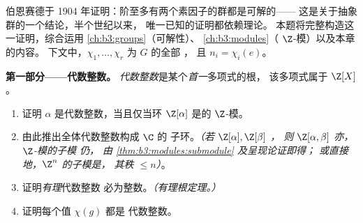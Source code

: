 \begin{problem}\label{pb:b3:representations:1}
伯恩赛德于 1904 年证明：阶至多有两个素因子的群都是可解的——
这是关于抽象群的一个结论，半个世纪以来，
唯一已知的证明都依赖理论。
本题将完整构造这一证明，综合运用 \cref{ch:b3:groups}（可解性）、
\cref{ch:b3:modules}（ $\Z$-模）以及本章的内容。
下文中，$\chi_1, \dots, \chi_r$ 为 $G$ 的全部
，
且 $n_i = \chi_i(e)$。

\medskip
\noindent\textbf{第一部分——代数整数。}
\emph{代数整数}是某个\emph{首一}多项式的根，
该多项式属于 $\Z[X]$。
\begin{enumerate}
  \item 证明 $\alpha$ 是代数整数，当且仅当环
        $\Z[\alpha]$ 是的 $\Z$-模。
  \item 由此推出全体代数整数构成 $\C$ 的
        子环。\emph{（若 $\Z[\alpha], \Z[\beta]$ ，
        则 $\Z[\alpha, \beta]$ 亦， $\Z$-模的子模
        仍，
        由 \cref{thm:b3:modules:submodule} 及呈现论证即得；
        或直接地，$\Z^n$ 的子模是，
        其秩 $\leq n$）}。
  \item 证明\emph{有理}代数整数
        必为整数。\emph{（有理根定理。）}
  \item 证明每个值 $\chi(g)$ 都是
        代数整数。
\end{enumerate}


\end{problem}

